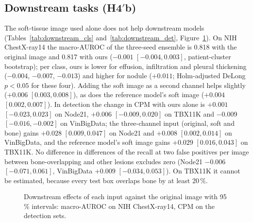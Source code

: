 \subsection{Downstream tasks (\texorpdfstring{H4$'$b}{H4'b})}
The soft-tissue image used alone does not help downstream models (Tables~\ref{tab:downstream_cls} and~\ref{tab:downstream_det},
Figure~\ref{fig:downstream_forest}). On NIH ChestX-ray14 the macro-AUROC of the three-seed ensemble is 0.818 with the original image and
0.817 with ours ($-0.001$ $[-0.004,0.003]$, patient-cluster bootstrap); per class, ours is lower for effusion, infiltration and pleural
thickening ($-0.004$, $-0.007$, $-0.013$) and higher for nodule ($+0.011$; Holm-adjusted DeLong $p<0.05$ for these four). Adding the soft image
as a second channel helps slightly ($+0.006$ $[0.003,0.008]$), as does the reference model's soft image ($+0.004$ $[0.002,0.007]$). In
detection the change in CPM with ours alone is $+0.001$ $[-0.023,0.023]$ on Node21, $+0.006$ $[-0.009,0.020]$ on TBX11K and $-0.009$
$[-0.016,-0.002]$ on VinBigData; the three-channel input (original, soft and bone) gains $+0.028$ $[0.009,0.047]$ on Node21 and $+0.008$
$[0.002,0.014]$ on VinBigData, and the reference model's soft image gains $+0.029$ $[0.016,0.043]$ on TBX11K. No difference in differences of
the recall at two false positives per image between bone-overlapping and other lesions excludes zero (Node21 $-0.006$ $[-0.071,0.061]$,
VinBigData $+0.009$ $[-0.034,0.053]$). On TBX11K it cannot be estimated, because every test box overlaps bone by at least 20\,\%.
\begin{table}[htbp]
\centering\small
\caption{Downstream classification on NIH ChestX-ray14: macro-AUROC of the three-seed ensemble, per-seed mean $\pm$ SD and the difference to
the original image (patient-cluster bootstrap).}
\label{tab:downstream_cls}
\end{table}
\begin{table}[htbp]
\centering\small
\caption{Downstream detection on Node21, TBX11K and VinBigData: CPM and mAP@50 (mean $\pm$ SD over three seeds), differences to the original
image and the difference in differences (DiD) of recall at two false positives per image (image bootstrap). both: the original, soft-tissue
and bone images as three channels.}
\label{tab:downstream_det}
\end{table}
\begin{figure}[htbp]
\centering
{}
\caption{Downstream effects of each input against the original image with 95\,\% intervals: macro-AUROC on NIH ChestX-ray14, CPM on the
detection sets.}
\label{fig:downstream_forest}
\end{figure}

